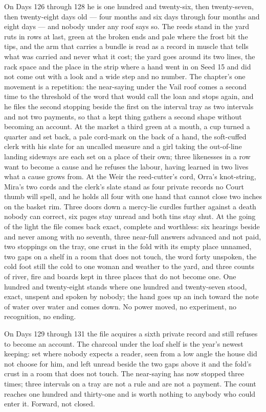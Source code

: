 \documentclass{design/chronicle}
\begin{document}
{On Days 126 through 128 he is one hundred and twenty-six, then twenty-seven, then twenty-eight days old — four months and six days through four months and eight days — and nobody under any roof says so. The reeds stand in the yard ruts in rows at last, green at the broken ends and pale where the frost bit the tips, and the arm that carries a bundle is read as a record in muscle that tells what was carried and never what it cost; the yard goes around its two lines, the rack space and the place in the strip where a hand went in on Seed 15 and did not come out with a look and a wide step and no number. The chapter’s one movement is a repetition: the near-saying under the Vail roof comes a second time to the threshold of the word that would call the loan and stops again, and he files the second stopping beside the first on the interval tray as two intervals and not two payments, so that a kept thing gathers a second shape without becoming an account. At the market a third green at a mouth, a cup turned a quarter and set back, a pale cord-mark on the back of a hand, the soft-cuffed clerk with his slate for an uncalled measure and a girl taking the out-of-line landing sideways are each set on a place of their own; three likenesses in a row want to become a cause and he refuses the labour, having learned in two lives what a cause grows from. At the Weir the reed-cutter’s cord, Orra’s knot-string, Mira’s two cords and the clerk’s slate stand as four private records no Court thumb will spell, and he holds all four with one hand that cannot close two inches on the basket rim. Three doors down a mercy-lie curdles further against a death nobody can correct, six pages stay unread and both tins stay shut. At the going of the light the file comes back exact, complete and worthless: six hearings beside and never among with no seventh, three near-full answers advanced and not paid, two stoppings on the tray, one crust in the fold with its empty place unnamed, two gaps on a shelf in a room that does not touch, the word forty unspoken, the cold foot still the cold to one woman and weather to the yard, and three counts of river, fire and boards kept in three places that do not become one. One hundred and twenty-eight stands where one hundred and twenty-seven stood, exact, unspent and spoken by nobody; the hand goes up an inch toward the note of water over water and comes down. No power moved, no experiment, no recognition, no ending.

On Days 129 through 131 the file acquires a sixth private record and still refuses to become an account. The charcoal under the loaf shelf is the year’s newest keeping: set where nobody expects a reader, seen from a low angle the house did not choose for him, and left unread beside the two gaps above it and the fold’s crust in a room that does not touch. The near-saying has now stopped three times; three intervals on a tray are not a rule and are not a payment. The count reaches one hundred and thirty-one and is worth nothing to anybody who could enter it. Forward, not closed.

}
\end{document}
